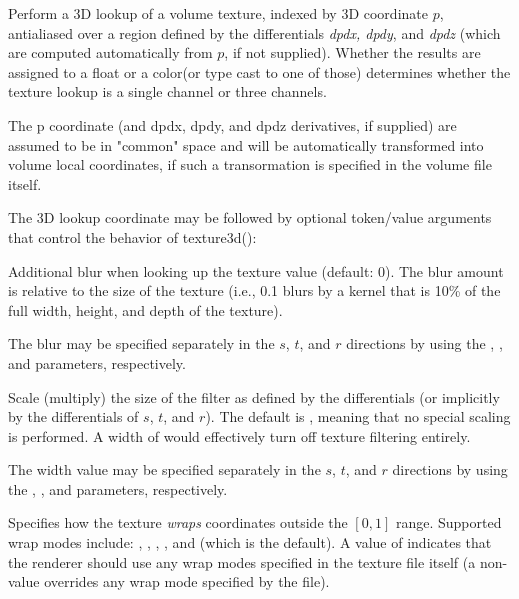 \documentclass[11pt,letterpaper]{book}
\def\color{{\cf color}\xspace}
\def\float{{\cf float}\xspace}
\def\commonspace{{\cf "common"} space\xspace}
\begin{document}
Perform a 3D lookup of a volume texture, indexed by 3D coordinate
$p$, antialiased over a region defined by the differentials
\emph{dpdx, dpdy}, and \emph{dpdz} (which are computed
automatically from $p$, if not supplied).  Whether the results
are assigned to a \float or a \color (or type cast to one of those)
determines whether the texture lookup is a single channel or three
channels.

The {\cf p} coordinate (and {\cf dpdx}, {\cf dpdy}, and {\cf dpdz}
derivatives, if supplied) are assumed to be in \commonspace and will be
automatically transformed into volume local coordinates, if such a
transormation is specified in the volume file itself.

The 3D lookup coordinate may be followed by optional token/value
arguments that control the behavior of {\cf texture3d()}:

\vspace{12pt}
Additional blur when looking up the texture value (default: 0).  The
blur amount is relative to the size of the texture (i.e., 0.1 blurs by a
kernel that is 10\% of the full width, height, and depth of the texture).

The blur may be specified separately in the $s$, $t$, and $r$ directions by
using the , , and  parameters, respectively.
\apiend
\vspace{-16pt}

\vspace{12pt}
Scale (multiply) the size of the filter as defined by the differentials
(or implicitly by the differentials of $s$, $t$, and $r$).  The default is
{}, meaning that no special scaling is performed.  A width of
{} would effectively turn off texture filtering entirely.

The width value may be specified separately in the $s$, $t$, and $r$
directions by using the , , and  parameters,
respectively.
\apiend
\vspace{-16pt}

\vspace{12pt}

Specifies how the texture \emph{wraps} coordinates outside the $[0,1]$
range.  Supported wrap modes include: , ,
, , and  (which is the default).  A
value of  indicates that the renderer should use any wrap
modes specified in the texture file itself (a non- value
overrides any wrap mode specified by the file).
\end{document}
